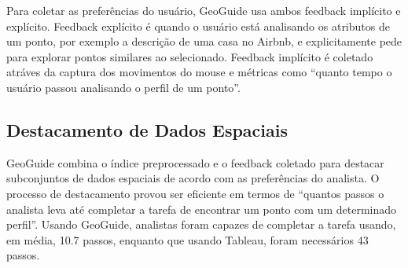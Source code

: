 Para coletar as preferências do usuário, GeoGuide usa ambos feedback implícito e explícito. Feedback explícito é quando o usuário está analisando os atributos de um ponto, por exemplo a descrição de uma casa no Airbnb, e explicitamente pede para explorar pontos similares ao selecionado. Feedback implícito é coletado atráves da captura dos movimentos do mouse e métricas como  ``quanto tempo o usuário passou analisando o perfil de um ponto''.

\subsection{Destacamento de Dados Espaciais}

GeoGuide combina o índice preprocessado e o feedback coletado para destacar subconjuntos de dados espaciais de acordo com as preferências do analista. O processo de destacamento provou ser eficiente em termos de ``quantos passos o analista leva até completar a tarefa de encontrar um ponto com um determinado perfil''. Usando GeoGuide, analistas foram capazes de completar a tarefa usando, em média, 10.7 passos, enquanto que usando Tableau, foram necessários 43 passos.


